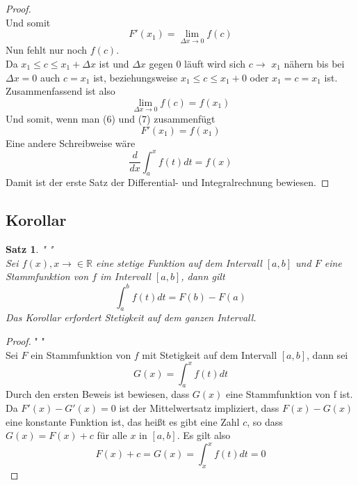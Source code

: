\documentclass[fontsize=12pt,paper=a4,DIV12,cleardoublepage=empty, 
liststotoc,idxtotoc,bibtotoc]{article}
\newcommand{\RR}{\mathbb{R}}
\theoremstyle{plain}
\newtheorem{satz}{Satz}[subsection]
\theoremstyle{definition}
\begin{document}
\begin{proof}
\begin{equation*}
		\end{equation*}
		Und somit
		\begin{equation}
			F'(x_1)=\lim \limits_{\Delta x \to 0}f(c)
		\end{equation}
		Nun fehlt nur noch $f(c)$.\\ Da $x_1 \leq c \leq x_1+\Delta x$ ist und $\Delta x$ gegen $0$ läuft wird sich $c\to$ $x_1$ nähern bis bei $\Delta x=0$ auch $c = x_1$ ist, beziehungsweise $x_1 \leq c \leq x_1 + 0$ oder $x_1 = c = x_1$ ist.\\Zusammenfassend ist also
		\begin{equation}
			\lim \limits_{\Delta x \to 0} f(c) = f(x_1)
		\end{equation}
		Und somit, wenn man (6) und (7) zusammenfügt
		\begin{equation*}
			F'(x_1)=f(x_1)
		\end{equation*}
		Eine andere Schreibweise wäre
		\begin{equation*}
			\frac{d}{dx}\int_{a}^{x}f(t)dt=f(x)
		\end{equation*}
		Damit ist der erste Satz der Differential- und Integralrechnung bewiesen.
	\end{proof}
	
	\subsection{Korollar}
	\begin{satz}" "\\
		Sei $f(x), x \to \in \RR$ eine stetige Funktion auf dem Intervall $[a, b]$ und $F$ eine Stammfunktion von $f$ im Intervall $[a, b]$, dann gilt
		\begin{equation*}
			\int_{a}^{b}f(t)dt=F(b)-F(a)
		\end{equation*}
		Das Korollar erfordert Stetigkeit auf dem ganzen Intervall.
	\end{satz}

	\begin{proof}" "\\
		Sei $F$ ein Stammfunktion von $f$ mit Stetigkeit auf dem Intervall $[a, b]$, dann sei
		\begin{equation*}
			G(x)=\int_{a}^{x}f(t)dt
		\end{equation*}
		Durch den ersten Beweis ist bewiesen, dass $G(x)$ eine Stammfunktion von f ist. Da $F'(x)-G'(x)=0$ ist der Mittelwertsatz impliziert, dass $F(x)-G(x)$ eine konstante Funktion ist, das heißt es gibt eine Zahl $c$, so dass $G(x)=F(x)+c$ für alle $x$ in $[a, b]$. Es gilt also
		\begin{equation*}
			F(x)+c=G(x)=\int_{x}^{x}f(t)dt=0
		\end{equation*}
	\end{proof}
		
\end{document}
